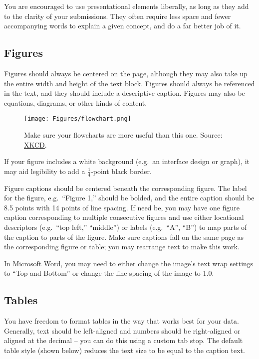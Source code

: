 \documentclass{jdf}
\begin{document}
You are encouraged to use presentational elements liberally, as long as
they add to the clarity of your submissions. They often require less
space and fewer accompanying words to explain a given concept, and do a
far better job of it.

\hypertarget{figures}{%
\subsection{Figures}\label{figures}}

Figures should always be centered on the page, although they may also
take up the entire width and height of the text block. Figures should
always be referenced in the text, and they should include a descriptive
caption. Figures may also be equations, diagrams, or other kinds of
content.

\begin{figure}
\centering
\texttt{[image: Figures/flowchart.png]}
\caption{Make sure your flowcharts are more useful than this one.
Source: \href{https://xkcd.com/1195/}{XKCD}.}
\end{figure}

If your figure includes a white background (e.g.~an interface design or
graph), it may aid legibility to add a \(\frac{1}{4}\)-point black
border.

Figure captions should be centered beneath the corresponding figure. The
label for the figure, e.g.~``Figure 1,'' should be bolded, and the
entire caption should be 8.5 points with 14 points of line spacing. If
need be, you may have one figure caption corresponding to multiple
consecutive figures and use either locational descriptors (e.g.~``top
left,'' ``middle'') or labels (e.g.~``A'', ``B'') to map parts of the
caption to parts of the figure. Make sure captions fall on the same page
as the corresponding figure or table; you may rearrange text to make
this work.

In Microsoft Word, you may need to either change the image's text wrap
settings to ``Top and Bottom'' or change the line spacing of the image
to 1.0.

\hypertarget{tables}{%
\subsection{Tables}\label{tables}}

You have freedom to format tables in the way that works best for your
data. Generally, text should be left-aligned and numbers should be
right-aligned or aligned at the decimal -- you can do this using a
custom tab stop. The default table style (shown below) reduces the text
size to be equal to the caption text.
\end{document}
